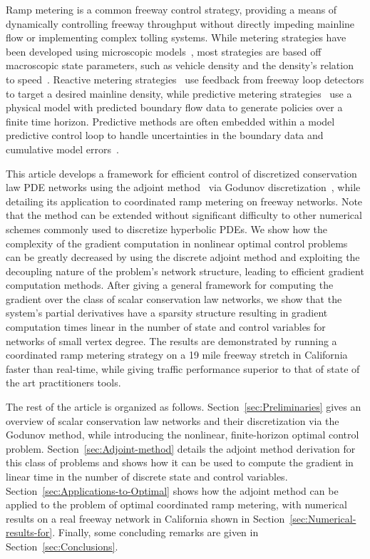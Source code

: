 Ramp metering is a common freeway control strategy, providing a means of 
dynamically controlling freeway throughput without directly impeding mainline 
flow or implementing complex tolling systems. While metering strategies have 
been developed using microscopic models~\cite{Ben-Akiva2003}, most strategies 
are based off macroscopic state parameters, such as vehicle density and the 
density's relation to 
speed~\cite{richards1956shock,lighthill1955kinematic,daganzo1995cell}. Reactive 
metering strategies~\cite{Papageorgiou1991,Papamichail,Kachroo2003} use 
feedback from freeway loop detectors to target a desired mainline density, 
while predictive metering 
strategies~\cite{Frejo2011,Kotsialos2004,gomes2006optimal,Chen1997} use a 
physical model with predicted boundary flow data to generate policies over a 
finite time horizon. Predictive methods are often embedded within a model 
predictive control loop to handle uncertainties in the boundary data and 
cumulative model errors~\cite{Muralidharana}.

This article develops a framework for efficient control of discretized 
conservation law PDE networks using the adjoint 
method~\cite{Giles2000,Pironneau1974} via Godunov 
discretization~\cite{godunov1959}, while detailing its application to 
coordinated ramp metering on freeway networks. Note that the method can be 
extended without significant difficulty to other numerical schemes commonly 
used to discretize hyperbolic PDEs. We show how the complexity of 
the gradient computation in nonlinear optimal control problems can be greatly 
decreased by using the discrete adjoint method and exploiting the decoupling 
nature of the problem's network structure, leading to efficient gradient 
computation methods. After giving a general framework for computing the gradient 
over the class of scalar conservation law networks, we show that the system's 
partial derivatives have a sparsity structure resulting in gradient computation 
times linear in the number of state and control variables for networks of small 
vertex degree. The results are 
demonstrated by running a coordinated ramp metering strategy on a 19 mile 
freeway stretch in California faster than real-time, while giving traffic 
performance superior to that of state of the art practitioners tools.

The rest of the article is organized as follows. 
Section~\ref{sec:Preliminaries} gives an 
overview of scalar conservation law networks and their discretization via the 
Godunov method, while introducing the nonlinear, finite-horizon optimal control 
problem. Section~\ref{sec:Adjoint-method} details the adjoint method derivation 
for this class of problems and shows how it can be used to compute the gradient 
in linear time in the number of discrete state and control variables.  
Section~\ref{sec:Applications-to-Optimal} shows how the adjoint method can be 
applied to the problem of optimal coordinated ramp metering, with numerical 
results on a real freeway network in California shown in 
Section~\ref{sec:Numerical-results-for}. Finally, some concluding remarks are 
given in Section~\ref{sec:Conclusions}.
